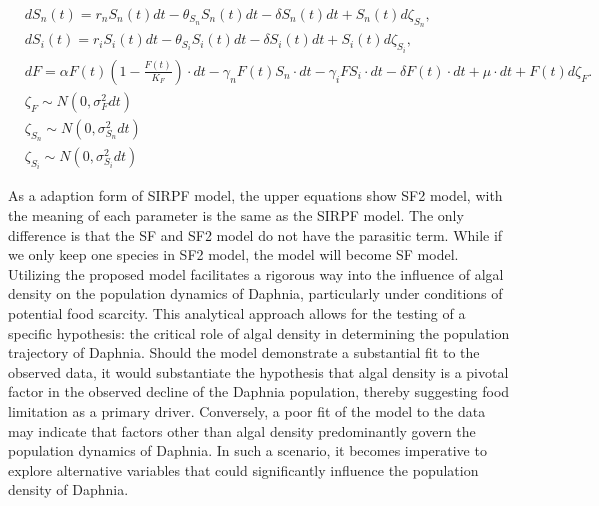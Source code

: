 \documentclass[12pt]{article}
\begin{document}
\begin{align}
&d S_n(t)=r_n S_n(t) dt- \theta_{S_n}S_n(t) dt -\delta S_n(t)dt + S_n(t) d\zeta_{S_n}, \\
&d S_i(t)=r_i S_i(t) dt- \theta_{S_i} S_i(t) dt -\delta S_i(t)dt + S_i(t) d\zeta_{S_i}, \\
&dF=\alpha F(t)\left(1-\frac{F(t)}{K_F}\right)\cdot dt-\gamma_n F(t) S_n \cdot dt - \gamma_i F S_i \cdot dt -\delta F(t) \cdot dt+ \mu \cdot dt +F(t) d \zeta_F.\\
&\zeta_F \sim N \left( 0, \sigma_F^2dt\right) \\
&\zeta_{S_n} \sim N \left( 0, \sigma_{S_n}^2dt  \right) \\
&\zeta_{S_i} \sim N \left( 0, \sigma_{S_i}^2dt \right) 
\end{align}

As a adaption form of SIRPF model, the upper equations show SF2 model, with the meaning of each parameter is the same as the SIRPF model. The only difference is that the SF and SF2 model do not have the parasitic term. While if we only keep one species in SF2 model, the model will become SF model. Utilizing the proposed model facilitates a rigorous way into the influence of algal density on the population dynamics of Daphnia, particularly under conditions of potential food scarcity. This analytical approach allows for the testing of a specific hypothesis: the critical role of algal density in determining the population trajectory of Daphnia. Should the model demonstrate a substantial fit to the observed data, it would substantiate the hypothesis that algal density is a pivotal factor in the observed decline of the Daphnia population, thereby suggesting food limitation as a primary driver. Conversely, a poor fit of the model to the data may indicate that factors other than algal density predominantly govern the population dynamics of Daphnia. In such a scenario, it becomes imperative to explore alternative variables that could significantly influence the population density of Daphnia.\\
\end{document}
